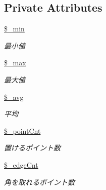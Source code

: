 \subsection*{Private Attributes}
\begin{DoxyCompactItemize}
\item 
\mbox{\label{class_reversi_anz_ae268ad2868ae3e63e753d709ea83ff8c}} 
\hyperlink{class_reversi_anz_ae268ad2868ae3e63e753d709ea83ff8c}{\$\+\_\+min}
\begin{DoxyCompactList}\small\item\em 最小値 \end{DoxyCompactList}\item 
\mbox{\label{class_reversi_anz_a03d7199ef0a0f57557579b2c68c903fd}} 
\hyperlink{class_reversi_anz_a03d7199ef0a0f57557579b2c68c903fd}{\$\+\_\+max}
\begin{DoxyCompactList}\small\item\em 最大値 \end{DoxyCompactList}\item 
\mbox{\label{class_reversi_anz_a7010adfa47d0c21665753ac9010fc86e}} 
\hyperlink{class_reversi_anz_a7010adfa47d0c21665753ac9010fc86e}{\$\+\_\+avg}
\begin{DoxyCompactList}\small\item\em 平均 \end{DoxyCompactList}\item 
\mbox{\label{class_reversi_anz_ac8c1f97213414e2aae74ab734086eba1}} 
\hyperlink{class_reversi_anz_ac8c1f97213414e2aae74ab734086eba1}{\$\+\_\+point\+Cnt}
\begin{DoxyCompactList}\small\item\em 置けるポイント数 \end{DoxyCompactList}\item 
\mbox{\label{class_reversi_anz_a276ec7259be48b6cfd5c3211661c71fe}} 
\hyperlink{class_reversi_anz_a276ec7259be48b6cfd5c3211661c71fe}{\$\+\_\+edge\+Cnt}
\begin{DoxyCompactList}\small\item\em 角を取れるポイント数 \end{DoxyCompactList}\item 
\mbox{\label{class_reversi_anz_a471d69c419fa3fa86ee418063de71a55}} 

\end{DoxyCompactItemize}
